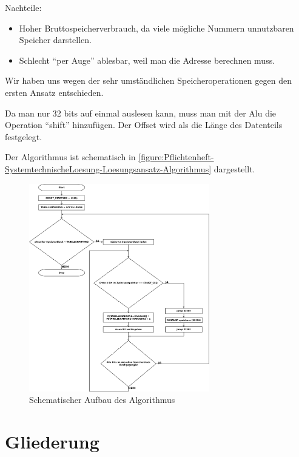 Nachteile:
\begin{itemize}
    \item Hoher Bruttospeicherverbrauch, da viele mögliche Nummern unnutzbaren Speicher darstellen.
    \item Schlecht "`per Auge"' ablesbar, weil man die Adresse berechnen muss.
\end{itemize}

Wir haben uns wegen der sehr umständlichen Speicheroperationen gegen den ersten Ansatz entschieden.

Da man nur 32 bits auf einmal auslesen kann, muss man mit der Alu die Operation "`shift"' hinzufügen. Der Offset wird als die Länge des Datenteils festgelegt.

Der Algorithmus ist schematisch in \autoref{figure:Pflichtenheft-SystemtechnischeLoesung-Loesungsansatz-Algorithmus} dargestellt.

\begin{figure}[htb]
    \centering
    \includegraphics[width=0.7\textwidth, height=0.7\textwidth, draft]{pflichtenheft/res/algorithmus.pdf}
    \caption{Schematischer Aufbau des Algorithmus}
    \label{figure:Pflichtenheft-SystemtechnischeLoesung-Loesungsansatz-Algorithmus}
\end{figure}



\section{Gliederung}
\label{section:Pflichtenheft-SystemtechnischeLoesung-Gliederung}

